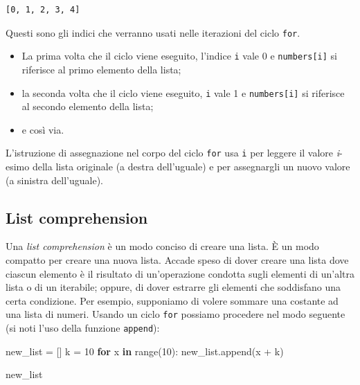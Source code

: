 \documentclass[
  letterpaper,
  krantz2]{{[}./krantz{]}}
\newenvironment{Shaded}{\begin{snugshade}}{\end{snugshade}}
\newcommand{\BuiltInTok}[1]{\textcolor[rgb]{0.00,0.23,0.31}{#1}}
\newcommand{\ControlFlowTok}[1]{\textcolor[rgb]{0.00,0.23,0.31}{\textbf{#1}}}
\newcommand{\DecValTok}[1]{\textcolor[rgb]{0.68,0.00,0.00}{#1}}
\newcommand{\KeywordTok}[1]{\textcolor[rgb]{0.00,0.23,0.31}{\textbf{#1}}}
\newcommand{\NormalTok}[1]{\textcolor[rgb]{0.00,0.23,0.31}{#1}}
\newcommand{\OperatorTok}[1]{\textcolor[rgb]{0.37,0.37,0.37}{#1}}
\providecommand{\tightlist}{%
  \setlength{\itemsep}{0pt}\setlength{\parskip}{0pt}}\usepackage{longtable,booktabs,array}
\begin{document}
\begin{verbatim}
[0, 1, 2, 3, 4]
\end{verbatim}

Questi sono gli indici che verranno usati nelle iterazioni del ciclo
\texttt{for}.

\begin{itemize}
\tightlist
\item
  La prima volta che il ciclo viene eseguito, l'indice \texttt{i} vale 0
  e \texttt{numbers{[}i{]}} si riferisce al primo elemento della lista;
\item
  la seconda volta che il ciclo viene eseguito, \texttt{i} vale 1 e
  \texttt{numbers{[}i{]}} si riferisce al secondo elemento della lista;
\item
  e così via.
\end{itemize}

L'istruzione di assegnazione nel corpo del ciclo \texttt{for} usa
\texttt{i} per leggere il valore \emph{i}-esimo della lista originale (a
destra dell'uguale) e per assegnargli un nuovo valore (a sinistra
dell'uguale).

\subsection{List comprehension}\label{list-comprehension}

Una \emph{list comprehension} è un modo conciso di creare una lista. È
un modo compatto per creare una nuova lista. Accade speso di dover
creare una lista dove ciascun elemento è il risultato di un'operazione
condotta sugli elementi di un'altra lista o di un iterabile; oppure, di
dover estrarre gli elementi che soddisfano una certa condizione. Per
esempio, supponiamo di volere sommare una costante ad una lista di
numeri. Usando un ciclo \texttt{for} possiamo procedere nel modo
seguente (si noti l'uso della funzione \texttt{append}):

\begin{Shaded}
\begin{Highlighting}[]
\NormalTok{new\_list }\OperatorTok{=}\NormalTok{ []}
\NormalTok{k }\OperatorTok{=} \DecValTok{10}
\ControlFlowTok{for}\NormalTok{ x }\KeywordTok{in} \BuiltInTok{range}\NormalTok{(}\DecValTok{10}\NormalTok{):}
\NormalTok{    new\_list.append(x }\OperatorTok{+}\NormalTok{ k)}

\NormalTok{new\_list}
\end{Highlighting}
\end{Shaded}
\end{document}
